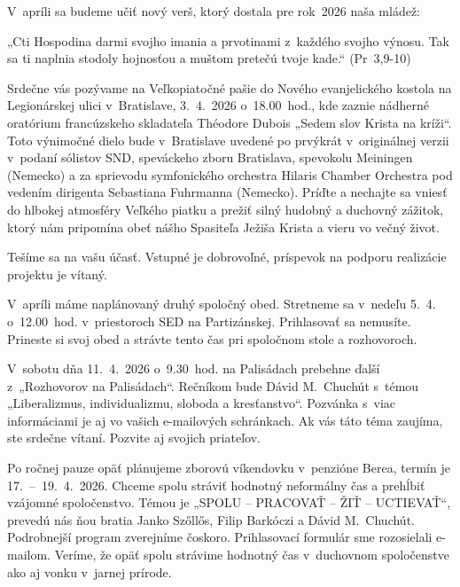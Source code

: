 \def\velkostpisma{10}
\def\velkostriadku{12.5}





V~apríli sa budeme učiť nový verš, ktorý dostala pre rok~2026 naša mládež:

„Cti Hospodina darmi svojho imania a prvotinami z~každého svojho výnosu. Tak sa ti naplnia stodoly hojnosťou a muštom pretečú tvoje kade.“ (Pr~3,9-10)


Srdečne vás pozývame na Veľkopiatočné pašie do Nového evanjelického kostola na Legionárskej ulici v~Bratislave, 3.~4.~2026 o~18.00~hod., kde zaznie
nádherné oratórium francúzskeho skladateľa Théodore Dubois „Sedem slov Krista na kríži“.
Toto výnimočné dielo bude v~Bratislave uvedené po prvýkrát v~originálnej verzii v~podaní sólistov SND, speváckeho zboru Bratislava, spevokolu Meiningen (Nemecko) a za sprievodu symfonického orchestra Hilaris Chamber Orchestra pod vedením dirigenta Sebastiana Fuhrmanna (Nemecko).
Príďte a nechajte sa vniesť do hlbokej atmosféry Veľkého piatku a prežiť silný hudobný a duchovný zážitok, ktorý nám pripomína obeť nášho Spasiteľa Ježiša Krista a vieru vo večný život.

Tešíme sa na vašu účasť. Vstupné je dobrovoľné, príspevok na podporu realizácie projektu je vítaný.


V~apríli máme naplánovaný druhý spoločný obed. Stretneme sa v~nedeľu 5.~4. o~12.00~hod. v~priestoroch SED na Partizánskej. Prihlasovať sa nemusíte. Prineste si svoj obed a strávte tento čas pri spoločnom stole a rozhovoroch.


V~sobotu dňa 11.~4.~2026 o~9.30~hod. na Palisádach prebehne ďalší z~„Rozhovorov na Palisádach“. Rečníkom bude Dávid M.~Chuchút s~témou „Liberalizmus, individualizmu, sloboda a kresťanstvo“.
Pozvánka s~viac informáciami je aj vo vašich e-mailových schránkach. Ak vás táto téma zaujíma, ste srdečne vítaní. Pozvite aj svojich priateľov.


Po ročnej pauze opäť plánujeme zborovú víkendovku v~penzióne Berea, termín je 17.~--~19.~4.~2026. Chceme spolu stráviť hodnotný neformálny čas a prehĺbiť vzájomné spoločenstvo. Témou je „SPOLU -- PRACOVAŤ -- ŽIŤ -- UCTIEVAŤ“, prevedú nás ňou bratia Janko Szőllős, Filip Barkóczi a Dávid M.~Chuchút. Podrobnejší program zverejníme čoskoro. Prihlasovací formulár sme rozosielali e-mailom. Veríme, že opäť spolu strávime hodnotný čas v~duchovnom spoločenstve ako aj vonku v~jarnej prírode.


